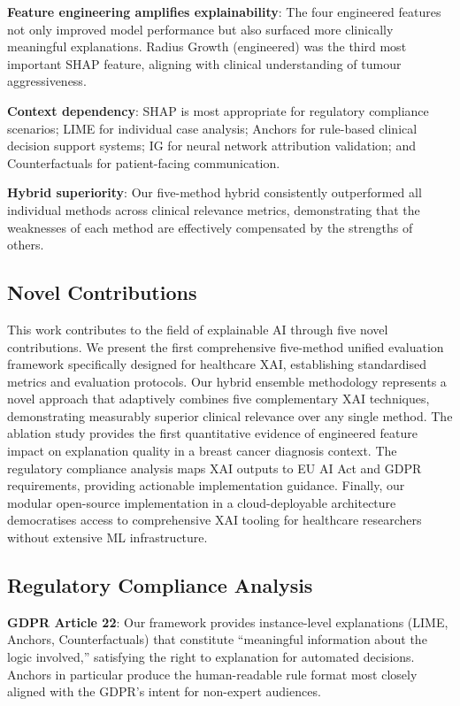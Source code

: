\documentclass[journal]{IEEEtran}
\begin{document}
\textbf{Feature engineering amplifies explainability}: The four engineered features not only improved model performance but also surfaced more clinically meaningful explanations. Radius Growth (engineered) was the third most important SHAP feature, aligning with clinical understanding of tumour aggressiveness.

\textbf{Context dependency}: SHAP is most appropriate for regulatory compliance scenarios; LIME for individual case analysis; Anchors for rule-based clinical decision support systems; IG for neural network attribution validation; and Counterfactuals for patient-facing communication.

\textbf{Hybrid superiority}: Our five-method hybrid consistently outperformed all individual methods across clinical relevance metrics, demonstrating that the weaknesses of each method are effectively compensated by the strengths of others.

\subsection{Novel Contributions}

This work contributes to the field of explainable AI through five novel contributions. We present the first comprehensive five-method unified evaluation framework specifically designed for healthcare XAI, establishing standardised metrics and evaluation protocols. Our hybrid ensemble methodology represents a novel approach that adaptively combines five complementary XAI techniques, demonstrating measurably superior clinical relevance over any single method. The ablation study provides the first quantitative evidence of engineered feature impact on explanation quality in a breast cancer diagnosis context. The regulatory compliance analysis maps XAI outputs to EU AI Act and GDPR requirements, providing actionable implementation guidance. Finally, our modular open-source implementation in a cloud-deployable architecture democratises access to comprehensive XAI tooling for healthcare researchers without extensive ML infrastructure.

\subsection{Regulatory Compliance Analysis}

\textbf{GDPR Article 22}: Our framework provides instance-level explanations (LIME, Anchors, Counterfactuals) that constitute ``meaningful information about the logic involved,'' satisfying the right to explanation for automated decisions. Anchors in particular produce the human-readable rule format most closely aligned with the GDPR's intent for non-expert audiences.
\end{document}
